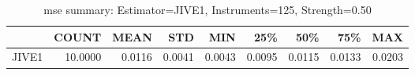 \begin{table}[ht]
\centering
\caption{mse summary: Estimator=JIVE1, Instruments=125, Strength=0.50}
\begin{tabular}{lrrrrrrrr}
\toprule
 & COUNT & MEAN & STD & MIN & 25\% & 50\% & 75\% & MAX \\
\midrule
JIVE1 & 10.0000 & 0.0116 & 0.0041 & 0.0043 & 0.0095 & 0.0115 & 0.0133 & 0.0203 \\
\bottomrule
\end{tabular}
\end{table}

